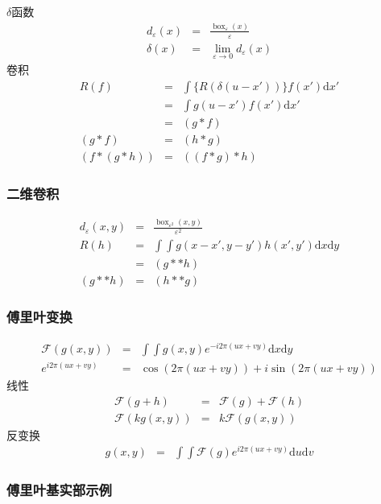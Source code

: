 \documentclass{beamer}
\newcommand{\mathd}{\mathrm{d}}
\newcommand{\nospace}{}
\newcommand{\tmop}[1]{\ensuremath{\operatorname{#1}}}
\newcommand{\nonconverted}[1]{\mbox{}}
\begin{document}
{{\begin{frame}
  $\delta$函数
  \begin{eqnarray*}
    d_{\varepsilon} (x) & = & \frac{\tmop{box}_{\varepsilon}
    (x)}{\varepsilon}\\
    \delta (x) & = & \lim_{\varepsilon \rightarrow 0} d_{\varepsilon} (x)
  \end{eqnarray*}
  卷积
  \begin{eqnarray*}
    R (f) & = & \int \{ R (\delta (u - x')) \} f (x') \mathd x'\\
    & = & \int g (u - x') f (x') \mathd x'\\
    & = & (g \ast f)\\
    (g \ast f) & = & (h \ast g)\\
    (f \ast (g \ast h)) & = & ((f \ast g) \ast h)
  \end{eqnarray*}
\end{frame}}{\begin{frame}
  \frametitle{二维卷积}
  \begin{eqnarray*}
    d_{\varepsilon} (x, y) & = & \frac{\tmop{box}_{\varepsilon^2} (x,
    y)}{\varepsilon^2}\\
    R (h) & = & \int \int g (x - x', y - y') h (x', y') \mathd x \mathd y\\
    & = & (g \ast \ast h)\\
    (g \ast \ast h) & = & (h \ast \ast g)
  \end{eqnarray*}
\end{frame}}{\begin{frame}
  \frametitle{傅里叶变换}
  
  
  \begin{eqnarray*}
    \mathcal{F} (g (x, y)) & = & \int \int g (x, y) e^{- i 2 \pi (u \nospace x
    + v \nospace y)} \mathd x \mathd y\\
    e^{\nonconverted{minus} i 2 \pi (u \nospace x + v \nospace y)} & = & \cos
    (2 \pi (u \nospace x + v \nospace y)) + i \nospace \sin (2 \pi (u \nospace
    x + v \nospace y))
  \end{eqnarray*}
  线性
  \begin{eqnarray*}
    \mathcal{F} (g + h) & = & \mathcal{F} (g) +\mathcal{F} (h)\\
    \mathcal{F} (k \nospace g (x, y)) & = & k\mathcal{F} (g (x, y))
  \end{eqnarray*}
  反变换
  \begin{eqnarray*}
    g (x, y) & = & \int \int \mathcal{F} (g) e^{i 2 \pi (u \nospace x + v
    \nospace y)} \mathd u \mathd v
  \end{eqnarray*}
\end{frame}}{\frametitle{傅里叶基实部示例}

}}
\end{document}

